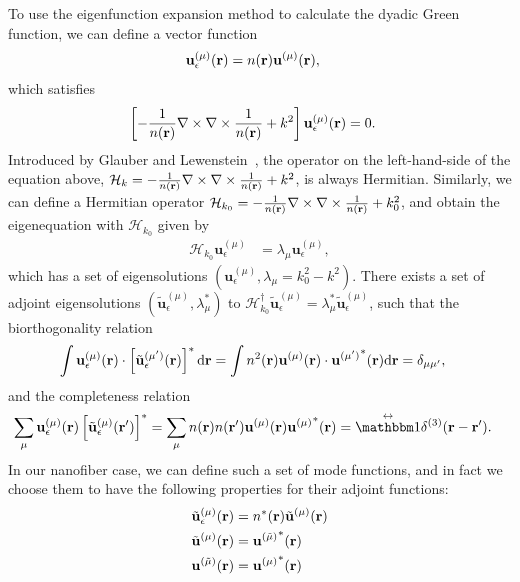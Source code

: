 To use the eigenfunction expansion method to calculate the dyadic Green function, we can define a vector function
\begin{align}
{\mathbf{u}}_\epsilon^{(\mu)}(\mathbf{r}) &= n(\mathbf{r}) \mathbf{u}^{(\mu)}(\mathbf{r}),
\end{align}
which satisfies
\begin{align}
\left[-\frac{1}{n(\mathbf{r})}\nabla\times\nabla\times \frac{1}{n(\mathbf{r})} + k^2\right]  {\mathbf{u}}_\epsilon^{(\mu)}(\mathbf{r}) &=0.
\end{align}
Introduced by Glauber and Lewenstein~\cite{Glauber1991}, the operator on the left-hand-side of the equation above, $\mathcal{H}_k = -\frac{1}{n(\mathbf{r})}\nabla\times\nabla\times \frac{1}{n(\mathbf{r})} + k^2$, is always Hermitian. Similarly, we can define a Hermitian operator $\mathcal{H}_{k_0} = -\frac{1}{n(\mathbf{r})}\nabla\times\nabla\times \frac{1}{n(\mathbf{r})} + k_0^2$, and obtain the eigenequation with $\mathcal{H}_{k_0}$ given by
\begin{align}
\mathcal{H}_{k_0} \mathbf{u}_\epsilon^{(\mu)} &= \lambda_\mu \mathbf{u}_\epsilon^{(\mu)},
\end{align}
which has a set of eigensolutions $ (\mathbf{u}_\epsilon^{(\mu)},\lambda_\mu=k_0^2-k^2) $. There exists a set of adjoint eigensolutions $ (\tilde{\mathbf{u}}_\epsilon^{(\mu)},\lambda_\mu^*) $ to $\mathcal{H}_{k_0}^\dagger \tilde{\mathbf{u}}_\epsilon^{(\mu)} = \lambda_\mu^* \tilde{\mathbf{u}}_\epsilon^{(\mu)}$, such that the biorthogonality relation
\begin{align}
\int \mathbf{u}_\epsilon^{(\mu)} (\br)\cdot \left[\tilde{\mathbf{u}}_\epsilon^{(\mu')}(\br) \right]^* \mathrm{d}\br &= \int n^2(\br) \mathbf{u}^{(\mu)} (\br)\cdot {\mathbf{u}^{(\mu')}}^*(\br) \mathrm{d}\br=\delta_{\mu\mu'},\label{eq:orthutrans}
\end{align}
and the completeness relation
\begin{align}
\sum_\mu \mathbf{u}_\epsilon^{(\mu)} (\br) \left[\tilde{\mathbf{u}}_\epsilon^{(\mu)}(\br') \right]^* &= \sum_\mu n(\br)n(\br') \mathbf{u}^{(\mu)} (\br) {\mathbf{u}^{(\mu)}}^*(\br) =\eye \delta^{(3)}(\br-\br'). 
\end{align}
In our nanofiber case, we can define such a set of mode functions, and in fact we choose them to have the following properties for their adjoint functions:
\begin{align}
\tilde{\mathbf{u}}_\epsilon^{(\mu)}(\mathbf{r}) &= n^*(\mathbf{r}) \tilde{\mathbf{u}}^{(\mu)}(\mathbf{r})\\
\tilde{\mathbf{u}}^{(\mu)}(\mathbf{r}) &= {\mathbf{u}^{(\tilde{\mu})}}^*(\mathbf{r})\\
{\mathbf{u}^{(\tilde{\mu})}}(\mathbf{r}) &= {\mathbf{u}^{(\mu)}}^*(\mathbf{r})
\end{align}
